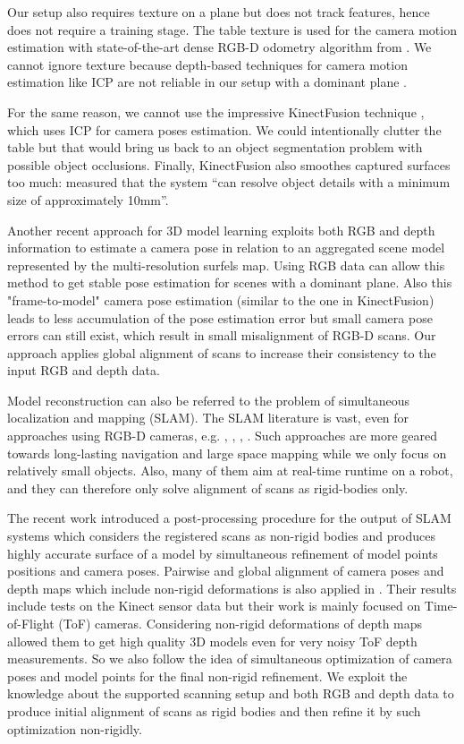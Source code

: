 \documentclass[letterpaper, 10 pt, conference]{ieeeconf}  %
\begin{document}
Our setup also requires 
texture on a plane but does not track features, hence does not require a training stage.
The table texture is used for the camera motion estimation 
with state-of-the-art dense RGB-D odometry algorithm from \cite{steinbrucker2011real}.
We cannot ignore texture because depth-based
techniques for camera motion estimation like ICP \cite{besl1992method} 
are not reliable in our setup with a dominant plane \cite{rusinkiewicz2001efficient}.


For the same reason, we cannot use
the impressive KinectFusion technique \cite{newcombe2011kinectfusion},
which uses ICP for camera poses estimation.
We could intentionally clutter the table but that would bring us back to
an object segmentation problem with possible object occlusions.
Finally, KinectFusion also smoothes captured surfaces too much: \cite{meister2012when} measured that
the system ``can resolve object details with a minimum size of approximately 10mm''.

Another recent approach \cite{stuckler2012model} for 3D model learning 
exploits both RGB and depth information to estimate a camera pose 
in relation to an aggregated scene model represented by the multi-resolution surfels map.
Using RGB data can allow this method to get stable pose estimation
for scenes with a dominant plane. Also this "frame-to-model" camera pose estimation (similar to the one in 
KinectFusion) leads to less accumulation of the pose estimation error
but small camera pose errors can still exist, which result in
small misalignment of RGB-D scans. Our approach applies global alignment of scans
to increase their consistency to the input RGB and depth data.

Model reconstruction can also be referred to the problem of simultaneous localization
and mapping (SLAM). The SLAM literature is vast, even for approaches using RGB-D
cameras, e.g. \cite{stuckler2012integrating},
\cite{endres2012evaluation}, \cite{henry2012rgb}, \cite{strasdat2011double}. Such approaches are more geared
towards long-lasting navigation and large space mapping while we only focus on relatively small objects.
Also, many of them aim at
real-time runtime on a robot, and they can therefore only solve alignment of scans 
as rigid-bodies only. 

The recent work \cite{ruhnke2012highly} introduced a post-processing procedure for the output of SLAM systems
which considers the registered scans as non-rigid bodies and produces highly accurate
surface of a model by simultaneous refinement of model points positions and camera poses.
Pairwise and global alignment of camera poses and depth maps which include non-rigid 
deformations is also applied in \cite{cui2012algorithms}. Their results include tests on the Kinect
sensor data but their work is mainly focused on Time-of-Flight (ToF) cameras. Considering non-rigid deformations 
of depth maps allowed them to get high quality 3D models even for very noisy ToF depth measurements.
So we also follow the idea of simultaneous optimization of camera poses and model points 
for the final non-rigid refinement. We exploit the knowledge 
about the supported scanning setup and both RGB and depth 
data to produce initial alignment of scans as rigid bodies
and then refine it by such optimization non-rigidly.
\end{document}
